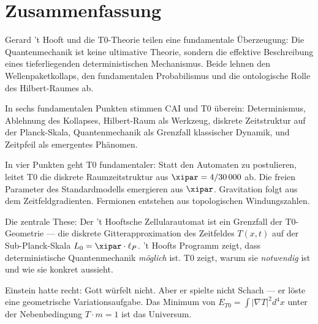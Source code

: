 \clearpage

\section{Zusammenfassung}
\label{sec:summary}

Gerard 't Hooft und die T0-Theorie teilen eine fundamentale Überzeugung: Die
Quantenmechanik ist keine ultimative Theorie, sondern die effektive Beschreibung
eines tieferliegenden deterministischen Mechanismus. Beide lehnen den
Wellenpaketkollaps, den fundamentalen Probabilismus und die ontologische
Rolle des Hilbert-Raumes ab.

In sechs fundamentalen Punkten stimmen CAI und T0 überein: Determinismus,
Ablehnung des Kollapses, Hilbert-Raum als Werkzeug, diskrete Zeitstruktur
auf der Planck-Skala, Quantenmechanik als Grenzfall klassischer Dynamik,
und Zeitpfeil als emergentes Phänomen.

In vier Punkten geht T0 fundamentaler: Statt den Automaten zu postulieren,
leitet T0 die diskrete Raumzeitstruktur aus $\xipar = 4/30\,000$ ab. Die
freien Parameter des Standardmodells emergieren aus $\xipar$. Gravitation
folgt aus dem Zeitfeldgradienten. Fermionen entstehen aus topologischen
Windungszahlen.

Die zentrale These: Der 't Hooftsche Zellularautomat ist ein Grenzfall der
T0-Geometrie — die diskrete Gitterapproximation des Zeitfeldes $T(x,t)$ auf
der Sub-Planck-Skala $L_0 = \xipar \cdot \ell_P$. 't Hoofts Programm zeigt,
dass deterministische Quantenmechanik \emph{möglich} ist. T0 zeigt, warum
sie \emph{notwendig} ist und wie sie konkret aussieht.

\begin{philosophical}
    Einstein hatte recht: Gott würfelt nicht. Aber er spielte nicht Schach —
    er löste eine geometrische Variationsaufgabe. Das Minimum von
    $E_{T0} = \int |\nabla T|^2 d^4x$ unter der Nebenbedingung $T \cdot m = 1$
    ist das Universum.
\end{philosophical}

